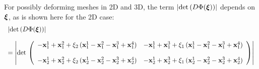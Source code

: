 For possibly deforming meshes in 2D and 3D, the term $|\hbox{det} \,(D\Phi(\boldsymbol{\xi}))|$ depends on $\boldsymbol{\xi}$, as is shown here for the 2D case:
\begin{equation}
  \begin{array}{ll}
    |\hbox{det} \,(D\Phi(\boldsymbol{\xi}))|\\[4mm]
     = \left|\hbox{det} \,
     \left(
    \begin{array}{ll}
      -\textbf{x}^1_1+\textbf{x}^2_1 + \xi_2\,(\textbf{x}^1_1-\textbf{x}^2_1-\textbf{x}^3_1+\textbf{x}^4_1) & 
      -\textbf{x}^1_1+\textbf{x}^3_1 + \xi_1\,(\textbf{x}^1_1-\textbf{x}^2_1-\textbf{x}^3_1+\textbf{x}^4_1) \\[4mm]
      -\textbf{x}^1_2+\textbf{x}^2_2 + \xi_2\,(\textbf{x}^1_2-\textbf{x}^2_2-\textbf{x}^3_2+\textbf{x}^4_2) & 
      -\textbf{x}^1_2+\textbf{x}^3_2 + \xi_1\,(\textbf{x}^1_2-\textbf{x}^2_2-\textbf{x}^3_2+\textbf{x}^4_2)
    \end{array}\right)
    \right|\\[12mm]

\end{array}
\end{equation}

